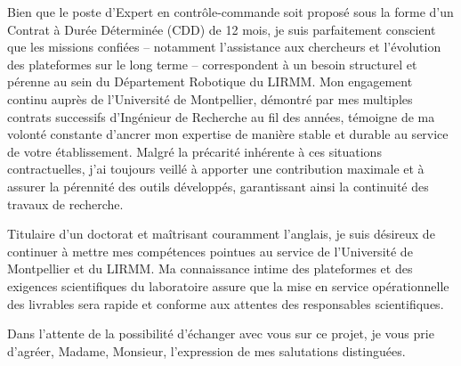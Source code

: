 \documentclass[11pt, a4paper]{awesome-cv}
\begin{document}
\begin{cvletter}
  Bien que le poste d’Expert en contrôle-commande soit proposé sous la forme d'un Contrat à Durée Déterminée
  (CDD) de 12 mois, je suis parfaitement conscient que les missions confiées – notamment l'assistance aux
  chercheurs et l'évolution des plateformes sur le long terme – correspondent à un besoin structurel et
  pérenne au sein du Département Robotique du LIRMM. Mon engagement continu auprès de l'Université de
  Montpellier, démontré par mes multiples contrats successifs d'Ingénieur de Recherche au fil des années,
  témoigne de ma volonté constante d'ancrer mon expertise de manière stable et durable au service de votre
  établissement. Malgré la précarité inhérente à ces situations contractuelles, j'ai toujours veillé à
  apporter une contribution maximale et à assurer la pérennité des outils développés, garantissant ainsi la
  continuité des travaux de recherche.

  Titulaire d'un doctorat et maîtrisant couramment l'anglais, je suis désireux de continuer à mettre mes
  compétences pointues au service de l'Université de Montpellier et du LIRMM. Ma connaissance intime des
  plateformes et des exigences scientifiques du laboratoire assure que la mise en service opérationnelle des
  livrables sera rapide et conforme aux attentes des responsables scientifiques.

  Dans l'attente de la possibilité d'échanger avec vous sur ce projet, je vous prie d’agréer, Madame,
  Monsieur, l’expression de mes salutations distinguées.

\end{cvletter}

\makeletterclosing
\end{document}
